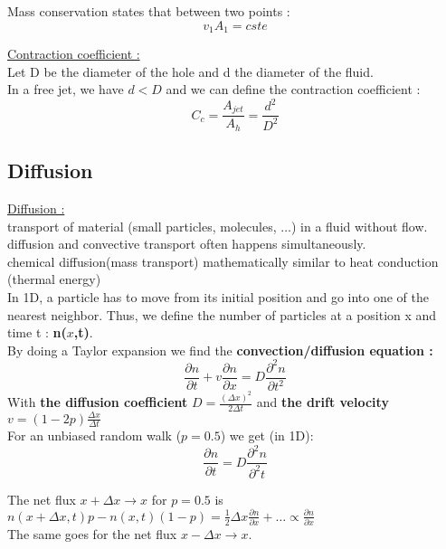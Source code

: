 \documentclass[../main.tex]{subfiles}
\begin{document}
Mass conservation states that between two points : \\
\begin{equation}
    v_1 A_1 = cste
\end{equation}

\quad \underline{Contraction coefficient :}\\
Let D be the diameter of the hole and d the diameter of the fluid. \\
In a free jet, we have $d<D$ and we can define the contraction coefficient : \\
\begin{equation}
    C_c = \frac{A_{jet}}{A_h} = \frac{d^2}{D^2}
\end{equation}

\subsection{Diffusion}
\quad \underline{Diffusion :}\\
transport of material (small particles, molecules, $\dots$) in a fluid without flow.\\
\color{gray}diffusion and convective transport often happens simultaneously. \\
chemical diffusion(mass transport) mathematically similar to heat conduction (thermal energy)\color{black}\\

In 1D, a particle has to move from its initial position and go into one of the nearest neighbor. Thus, we define the number of particles at a position x and time t : \textbf{n($x$,t)}.\\
By doing a Taylor expansion we find the \textbf{convection/diffusion equation :}\\
\begin{equation}
    \frac{\partial n}{\partial t} + v \frac{\partial n}{\partial x} = D \frac{\partial^2 n}{\partial t^2}
\end{equation}
With \textbf{the diffusion coefficient} $D = \frac{(\Delta x)^2}{2 \Delta t}$ and \textbf{the drift velocity} $v = (1-2p) \frac{\Delta x}{\Delta t}$\\

For an unbiased random walk ($p=0.5$) we get (in 1D):\\
\begin{equation}
    \frac{\partial n}{\partial t} = D \frac{\partial^2 n}{\partial^2 t}
\end{equation}

\color{gray}The net flux $x+\Delta x \rightarrow x$ for $p=0.5$ is $n(x+\Delta x,t)p-n(x,t)(1-p) = \frac{1}{2} \Delta x \frac{\partial n}{\partial x}+ \dots \propto \frac{\partial n}{\partial x}$\\
The same goes for the net flux $x-\Delta x \rightarrow x$.\color{black}\\
\end{document}

